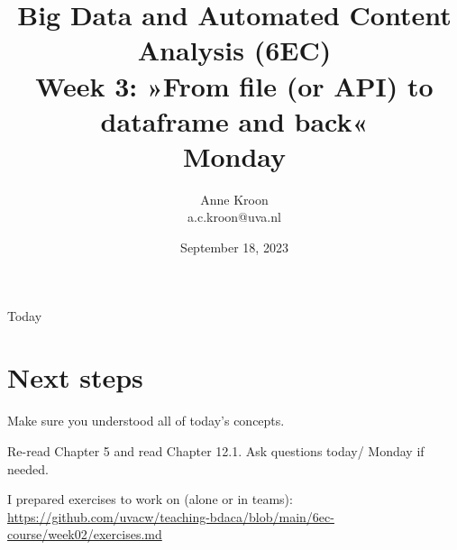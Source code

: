 

\graphicspath{{../../resources/img/}}




\title[Big Data and Automated Content Analysis]{\textbf{Big Data and Automated Content Analysis (6EC)} 
\\Week 3: »From file (or API) to dataframe and back«
\\Monday }
\author[Anne Kroon]{Anne Kroon\\ \footnotesize{a.c.kroon@uva.nl \\}}
\date{September 18, 2023}


\begin{frame}{}
	\titlepage
\end{frame}

\begin{frame}{Today}
	\tableofcontents
\end{frame}

	








\section{Next steps}




\begin{frame}[standout]
Make sure you understood all of today's concepts.

Re-read Chapter 5 and read Chapter 12.1. Ask questions today/ Monday if needed.

I prepared exercises to work on (alone or in teams):
\large{\url{https://github.com/uvacw/teaching-bdaca/blob/main/6ec-course/week02/exercises.md}}
\end{frame}





\begin{frame}
	\printbibliography
\end{frame}





